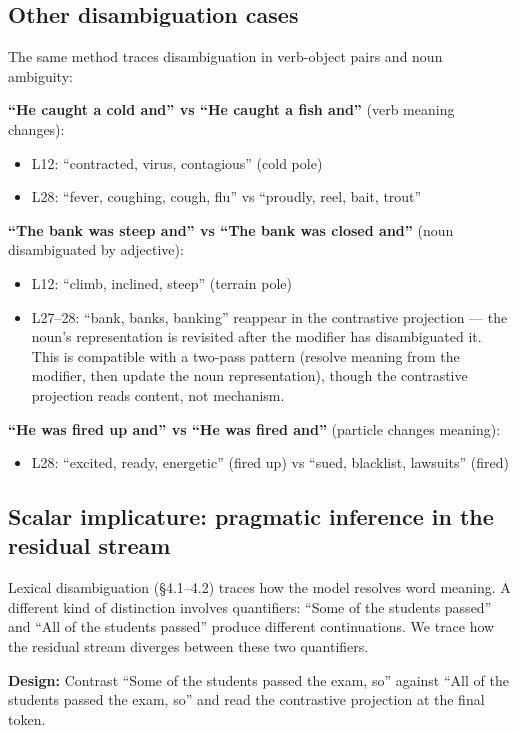 \documentclass[11pt]{article}
\begin{document}
\subsection{Other disambiguation cases}

The same method traces disambiguation in verb-object pairs and noun ambiguity:

\textbf{``He caught a cold and'' vs ``He caught a fish and''} (verb meaning changes):
\begin{itemize}[leftmargin=*]
\item L12: ``contracted, virus, contagious'' (cold pole)
\item L28: ``fever, coughing, cough, flu'' vs ``proudly, reel, bait, trout''
\end{itemize}

\textbf{``The bank was steep and'' vs ``The bank was closed and''} (noun disambiguated by
adjective):
\begin{itemize}[leftmargin=*]
\item L12: ``climb, inclined, steep'' (terrain pole)
\item L27--28: ``bank, banks, banking'' reappear in the contrastive projection ---
  the noun's representation is revisited after the modifier has disambiguated
  it. This is compatible with a two-pass pattern (resolve meaning from the
  modifier, then update the noun representation), though the contrastive
  projection reads content, not mechanism.
\end{itemize}

\textbf{``He was fired up and'' vs ``He was fired and''} (particle changes meaning):
\begin{itemize}[leftmargin=*]
\item L28: ``excited, ready, energetic'' (fired up) vs ``sued, blacklist, lawsuits''
  (fired)
\end{itemize}

\subsection{Scalar implicature: pragmatic inference in the residual stream}

Lexical disambiguation (\S4.1--4.2) traces how the model resolves word meaning.
A different kind of distinction involves quantifiers: ``Some of the students
passed'' and ``All of the students passed'' produce different continuations.
We trace how the residual stream diverges between these two quantifiers.

\textbf{Design:} Contrast ``Some of the students passed the exam, so'' against
``All of the students passed the exam, so'' and read the contrastive projection
at the final token.
\end{document}
